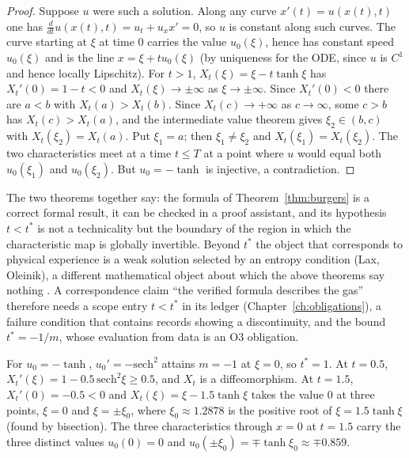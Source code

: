 \begin{proof}
Suppose $u$ were such a solution. Along any curve $x'(t)=u(x(t),t)$ one has $\frac{d}{dt}u(x(t),t)=u_t+u_xx'=0$, so $u$ is constant along such curves. The curve starting at $\xi$ at time $0$ carries the value $u_0(\xi)$, hence has constant speed $u_0(\xi)$ and is the line $x=\xi+tu_0(\xi)$ (by uniqueness for the ODE, since $u$ is $C^1$ and hence locally Lipschitz). For $t>1$, $X_t(\xi)=\xi-t\tanh\xi$ has $X_t'(0)=1-t<0$ and $X_t(\xi)\to\pm\infty$ as $\xi\to\pm\infty$. Since $X_t'(0)<0$ there are $a<b$ with $X_t(a)>X_t(b)$. Since $X_t(c)\to+\infty$ as $c\to\infty$, some $c>b$ has $X_t(c)>X_t(a)$, and the intermediate value theorem gives $\xi_2\in(b,c)$ with $X_t(\xi_2)=X_t(a)$. Put $\xi_1=a$; then $\xi_1\neq\xi_2$ and $X_t(\xi_1)=X_t(\xi_2)$. The two characteristics meet at a time $t\le T$ at a point where $u$ would equal both $u_0(\xi_1)$ and $u_0(\xi_2)$. But $u_0=-\tanh$ is injective, a contradiction.
\end{proof}

The two theorems together say: the formula of Theorem~\ref{thm:burgers} is a correct formal result, it can be checked in a proof assistant, and its hypothesis $t<t^\ast$ is not a technicality but the boundary of the region in which the characteristic map is globally invertible. Beyond $t^\ast$ the object that corresponds to physical experience is a weak solution selected by an entropy condition (Lax, Oleinik), a different mathematical object about which the above theorems say nothing \cite{evans-pde}. A correspondence claim ``the verified formula describes the gas'' therefore needs a scope entry $t<t^\ast$ in its ledger (Chapter~\ref{ch:obligations}), a failure condition that contains records showing a discontinuity, and the bound $t^\ast=-1/m$, whose evaluation from data is an $\mathrm O3$ obligation.

\begin{example}
For $u_0=-\tanh$, $u_0'=-\mathrm{sech}^2$ attains $m=-1$ at $\xi=0$, so $t^\ast=1$. At $t=0.5$, $X_t'(\xi)=1-0.5\,\mathrm{sech}^2\xi\ge0.5$, and $X_t$ is a diffeomorphism. At $t=1.5$, $X_t'(0)=-0.5<0$ and $X_t(\xi)=\xi-1.5\tanh\xi$ takes the value $0$ at three points, $\xi=0$ and $\xi=\pm\xi_0$, where $\xi_0\approx1.2878$ is the positive root of $\xi=1.5\tanh\xi$ (found by bisection). The three characteristics through $x=0$ at $t=1.5$ carry the three distinct values $u_0(0)=0$ and $u_0(\pm\xi_0)=\mp\tanh\xi_0\approx\mp0.859$.
\end{example}

